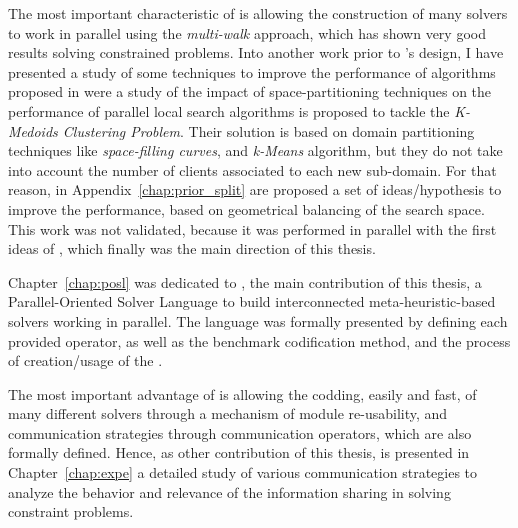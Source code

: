 The most important characteristic of \posl{} is allowing the construction of many solvers to work in parallel using the \textit{multi-walk} approach, which has shown very good results solving constrained problems. Into another work prior to \posl's design, I have presented a study of some techniques to improve the performance of algorithms proposed in \cite{Arbelaez2012} were a study of the impact of space-partitioning techniques on the performance of parallel local search algorithms is proposed to tackle the \textit{K-Medoids Clustering Problem}.  Their solution is based on domain partitioning techniques like {\it space-filling curves}, and {\it k-Means} algorithm, but they do not take into account the number of clients associated to each new sub-domain. For that reason, in Appendix~\ref{chap:prior_split} are proposed a set of ideas/hypothesis to improve the performance, based on geometrical balancing of the search space. This work was not validated, because it was performed in parallel with the first ideas of \posl, which finally was the main direction of this thesis.

Chapter~\ref{chap:posl} was dedicated to \posl, the main contribution of this thesis, a Parallel-Oriented Solver Language to build
interconnected meta-heuristic-based solvers working in parallel. The language was formally presented by defining each provided operator, as well as the benchmark codification method, and the process of creation/usage of the \bothmodules. 

The most important advantage of \posl{} is allowing the codding, easily and fast, of many different solvers through a mechanism of module re-usability, and communication strategies through communication operators, which are also formally defined. Hence, as other contribution of this thesis, is presented in Chapter~\ref{chap:expe} a detailed study of various communication strategies to analyze the behavior and relevance of the information sharing in solving constraint problems.

